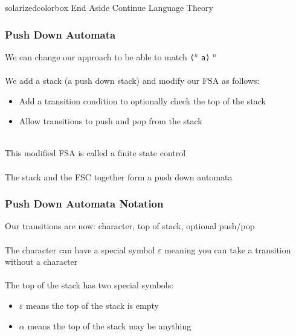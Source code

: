 \documentclass[aspectratio=169]{beamer}
\begin{document}
\begin{frame}
  \begin{beamercolorbox}[wd=\paperwidth, sep=2em]{solarizedcolorbox}
    {End Aside \hfill Continue
      Language Theory}
  \end{beamercolorbox}
\end{frame}

\begin{frame}
\frametitle{Push Down Automata}

We can change our approach to be able to match \lstinline{(}$^n$ \lstinline{a)}
$^n$\\~\\

We add a stack (a push down stack) and modify our FSA as follows:
\begin{itemize}
  \item Add a transition condition to optionally check the top of the stack 
  \item Allow transitions to push and pop from the stack\\~\\
\end{itemize}

This modified FSA is called a \alert{finite state control}\\~\\

The stack and the FSC together form a \alert{push down automata}
\end{frame}

\begin{frame}
\frametitle{Push Down Automata Notation}

Our transitions are now: character, top of stack, optional push/pop\\~\\

The character can have a special symbol $\varepsilon$ meaning you can take a
transition without a character\\~\\

The top of the stack has two special symbols:
\begin{itemize}
  \item $\varepsilon$ means the top of the stack is empty
  \item $\alpha$ means the top of the stack may be anything
\end{itemize}
\end{frame}
\end{document}

